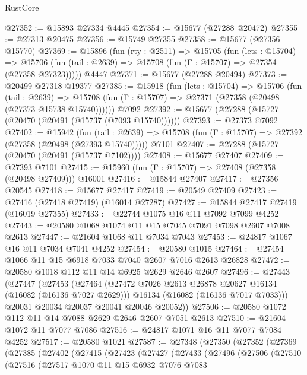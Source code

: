 \begin{lexlean}{RustCore}
\begin{coremodule}
@27352 := @15893 @27334 @4445
@27354 := @15677 (@27288 @20472)
@27355 := @27313 @20475
@27356 := @15749 @27355
@27358 := @15677 (@27356 @15770)
@27369 := @15896
    (fun (rty : @2511) =>
    @15705
      (fun (lets : @15704) =>
      @15706 (fun (tail : @2639) => @15708 (fun (Γ : @15707) => @27354 (@27358 @27323)))))
    @4447
@27371 := @15677 (@27288 @20494)
@27373 := @20499 @27318 @19377
@27385 := @15918
    (fun (lets : @15704) =>
    @15706
      (fun (tail : @2639) =>
      @15708 (fun (Γ : @15707) => @27371 (@27358 (@20498 (@27373 @15738 @15740))))))
    @7092
@27392 := @15677 (@27288 (@15727 (@20470 (@20491 (@15737 (@7093 @15740))))))
@27393 := @27373 @7092
@27402 := @15942
    (fun (tail : @2639) => @15708 (fun (Γ : @15707) => @27392 (@27358 (@20498 (@27393 @15740)))))
    @7101
@27407 := @27288 (@15727 (@20470 (@20491 (@15737 @7102))))
@27408 := @15677 @27407
@27409 := @27393 @7101
@27415 := @15960 (fun (Γ : @15707) => @27408 (@27358 (@20498 @27409))) @16001
@27416 := @15844 @27407
@27417 := @27356 @20545
@27418 := @15677 @27417
@27419 := @20549 @27409
@27423 := @27416 (@27418 @27419) (@16014 @27287)
@27427 := @15844 @27417 @27419 (@16019 @27355)
@27433 := @22744 @1075 @16 @11 @7092 @7099 @4252
@27443 := @20580 @1068 @1074 @11 @15 @7045 @7091 @7098 @2607 @7008 @2613
@27447 := @21604 @1068 @11 @7034 @7043
@27453 := @24817 @1067 @16 @11 @7034 @7041 @4252
@27454 := @20580 @1015
@27464 := @27454 @1066 @11 @15 @6918 @7033 @7040 @2607 @7016 @2613 @26828
@27472 := @20580 @1018 @112 @11 @14 @6925 @2629 @2646 @2607
@27496 := @27443
    (@27447
      (@27453
        (@27464
          (@27472 @7026 @2613 @26878 @20627 @16134 (@16082 (@16136 @7027 @2629)))
          @16134
          (@16082 (@16136 @7017 @7033)))
        @20031
        @20034
        @20037
        @20041
        @20046
        @20052))
@27506 := @20580 @1072 @112 @11 @14 @7088 @2629 @2646 @2607 @7051 @2613
@27510 := @21604 @1072 @11 @7077 @7086
@27516 := @24817 @1071 @16 @11 @7077 @7084 @4252
@27517 := @20580 @1021
@27587 := @27348
    (@27350
      (@27352
        (@27369
          (@27385
            (@27402
              (@27415
                (@27423
                  (@27427
                    (@27433
                      (@27496
                        (@27506
                          (@27510
                            (@27516
                              (@27517
                                @1070
                                @11
                                @15
                                @6932
                                @7076
                                @7083

\end{coremodule}
\end{lexlean}
